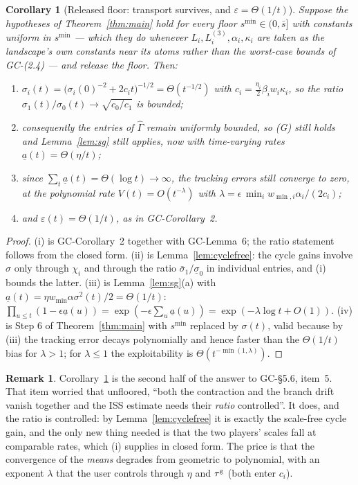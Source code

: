 \documentclass[11pt]{article}
\newtheorem{corollary}{Corollary}
\theoremstyle{definition}
\newtheorem{remark}{Remark}
\newcommand{\GC}[1]{\textsf{GC-#1}}
\begin{document}
\begin{corollary}[Released floor: transport survives, and $\varepsilon =
\Theta(1/t)$]\label{cor:unfloored}
Suppose the hypotheses of Theorem~\ref{thm:main} hold for every floor
$s^{\min} \in (0, \bar s]$ with constants uniform in $s^{\min}$ --- which they do
whenever $L_i, L^{(3)}_i, \alpha_i, \kappa_i$ are taken as the landscape's own
constants near its atoms rather than the worst-case bounds of \GC{(2.4)} --- and
release the floor. Then:
\begin{enumerate}
\item[(i)] $\sigma_{i}(t) = \big(\sigma_i(0)^{-2} + 2c_it\big)^{-1/2} =
  \Theta(t^{-1/2})$ with $c_i = \tfrac{\eta_i}{2}\beta_i w_i\kappa_i$, so the
  ratio $\sigma_1(t)/\sigma_0(t) \to \sqrt{c_0/c_1}$ is bounded;
\item[(ii)] consequently the entries of $\hat\Gamma$ remain uniformly bounded, so
  (G) still holds and Lemma~\ref{lem:sg} still applies, now with time-varying
  rates $\underline a(t) = \Theta(\eta/t)$;
\item[(iii)] since $\sum_t \underline a(t) = \Theta(\log t) \to \infty$, the
  tracking errors still converge to zero, at the polynomial rate
  $V(t) = O(t^{-\lambda})$ with $\lambda = \epsilon\,\min_i w_{\min,i}\alpha_i
  /(2c_i)$;
\item[(iv)] and $\varepsilon(t) = \Theta(1/t)$, as in \GC{Corollary~2}.
\end{enumerate}
\end{corollary}

\begin{proof}
(i) is \GC{Corollary~2} together with \GC{Lemma~6}; the ratio statement follows
from the closed form. (ii) is Lemma~\ref{lem:cyclefree}: the cycle gains involve
$\sigma$ only through $\chi_i$ and through the ratio $\bar\sigma_1/\underline
\sigma_0$ in individual entries, and (i) bounds the latter. (iii) is
Lemma~\ref{lem:sg}(a) with $\underline a(t) = \eta w_{\min}\alpha\sigma^2(t)/2
= \Theta(1/t)$: $\prod_{u \le t}(1 - \epsilon\underline a(u)) =
\exp(-\epsilon\sum_u \underline a(u)) = \exp(-\lambda\log t + O(1))$. (iv) is Step
6 of Theorem~\ref{thm:main} with $s^{\min}$ replaced by $\sigma(t)$, valid because
by (iii) the tracking error decays polynomially and hence faster than the
$\Theta(1/t)$ bias for $\lambda > 1$; for $\lambda \le 1$ the exploitability is
$\Theta(t^{-\min(1,\lambda)})$.
\end{proof}

\begin{remark}
Corollary~\ref{cor:unfloored} is the second half of the answer to \GC{\S5.6},
item~5. That item worried that unfloored, ``both the contraction and the branch
drift vanish together and the ISS estimate needs their \emph{ratio} controlled''.
It does, and the ratio is controlled: by Lemma~\ref{lem:cyclefree} it is exactly
the scale-free cycle gain, and the only new thing needed is that the two players'
scales fall at comparable rates, which (i) supplies in closed form. The price is
that the convergence of the \emph{means} degrades from geometric to polynomial,
with an exponent $\lambda$ that the user controls through $\eta$ and $\tau^{\rm g}$
(both enter $c_i$).
\end{remark}
\end{document}
